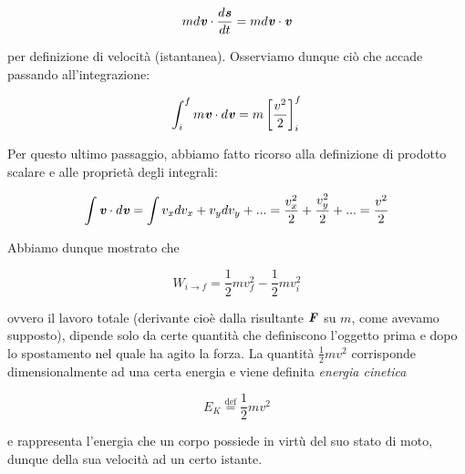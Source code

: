\[ m d\textbf{\textit{v}} \cdot \frac{d\textbf{\textit{s}}}{dt} = m d\textbf{\textit{v}} \cdot \textbf{\textit{v}} \]

\noindent per definizione di velocità (istantanea). Osserviamo
dunque ciò che accade passando all'integrazione:

\[ \int_{i}^{f} m \textbf{\textit{v}} \cdot d\textbf{\textit{v}} = m \left[\frac{v^2}{2}\right]_{i}^{f} \]

\noindent Per questo ultimo passaggio, abbiamo fatto ricorso alla
definizione di prodotto scalare e alle proprietà degli integrali:

\[ \int \textbf{\textit{v}} \cdot d\textbf{\textit{v}} = \int v_x dv_x + v_y dv_y + ... = \frac{v_x^2}{2} + \frac{v_y^2}{2} + ... = \frac{v^2}{2} \]

\noindent Abbiamo dunque mostrato che

\[ W_{i \to f} = \frac{1}{2}mv_f^2 - \frac{1}{2}mv_i^2 \]

\noindent ovvero il lavoro totale (derivante cioè dalla risultante
$\textbf{\textit{F}}$ su $m$, come avevamo supposto), dipende solo da
certe quantità che definiscono l'oggetto prima e dopo lo spostamento
nel quale ha agito la forza. La quantità $\frac12mv^2$ corrisponde
dimensionalmente ad una certa energia e viene definita
\textit{energia cinetica}

\[ E_K \stackrel{\text{def}}{=} \frac{1}{2}mv^2 \]

\noindent e rappresenta l'energia che un corpo possiede in
virtù del suo stato di moto, dunque della sua velocità ad un
certo istante.



